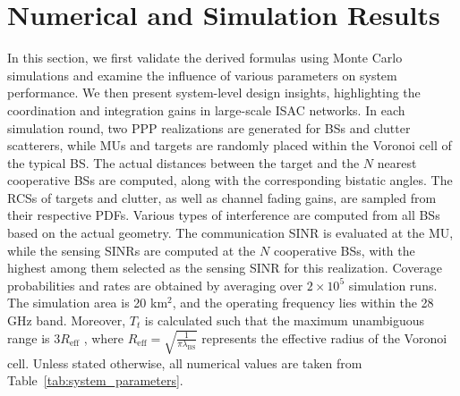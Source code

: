 \documentclass[journal]{IEEEtran}
\begin{document}
\section{Numerical and Simulation Results}\label{num_ress} 

In this section, we first validate the derived formulas using Monte Carlo simulations and examine the influence of various parameters on system performance. We then present system-level design insights, highlighting the coordination and integration gains in large-scale ISAC networks.
 In each simulation round, two PPP realizations are generated for BSs and clutter scatterers, while MUs and targets are randomly placed within the Voronoi cell of the typical BS. The actual distances between the target and the $N$ nearest cooperative BSs are computed, along with the corresponding bistatic angles. The RCSs of targets and clutter, as well as channel fading gains, are sampled from their respective PDFs. Various types of interference are computed from all BSs based on the actual geometry. The communication SINR is evaluated at the MU, while the sensing SINRs are computed at the $N$ cooperative BSs, with the highest among them selected as the sensing SINR for this realization. Coverage probabilities and rates are obtained by averaging over $2 \times 10^5$ simulation runs. The simulation area is 20 km$^2$,
and the operating frequency lies within the 28 GHz band. Moreover, \( T_t \) is calculated such that the maximum unambiguous range is \( 3R_{\text{eff}} \) \cite{olson2023coverage}, where \( R_{\text{eff}} = \sqrt{\frac{1}{\pi \lambda_{\text{BS}}}} \) represents the effective radius of the Voronoi cell.
Unless stated otherwise, all numerical values are taken from Table~\ref{tab:system_parameters}.
\end{document}
